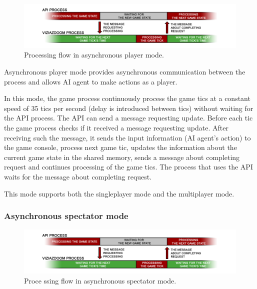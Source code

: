 \documentclass[english,bachelor,a4paper,twoside]{ppfcmthesis}
\begin{document}
	    \begin{figure}
			    \centering
			    \includegraphics[scale=0.24]{async_player_mode_diagram.png}
			    \caption{Processing flow in asynchronous player mode.}\label{fig:async_player_mode_diagram}
	    \end{figure}
	    
	    Asynchronous player mode provides asynchronous communication between the process and allows AI agent to make actions as a player. 
	    
	    In this mode, the game process continuously process the game tics at a constant speed of 35 tics per second (delay is introduced between tics) without waiting for the API process. The API can send a message requesting update. Before each tic the game process checks if it received a message requesting update. After receiving such the message, it sends the input information (AI agent's action) to the game console, process next game tic, updates the information about the current game state in the shared memory, sends a message about completing request and continues processing of the game tics. The process that uses the API waits for the message about completing request.
	    
	    This mode supports both the singleplayer mode and the multiplayer mode.

    \subsubsection{Asynchronous spectator mode}\label{sec:architecture_async_spectator_mode}

	    \begin{figure}
			    \centering
			    \includegraphics[scale=0.24]{async_spectator_mode_diagram.png}
			    \caption{Proce      ssing flow in asynchronous spectator mode.}\label{fig:async_spectator_mode_diagram}
	    \end{figure}
	    
\end{document}
